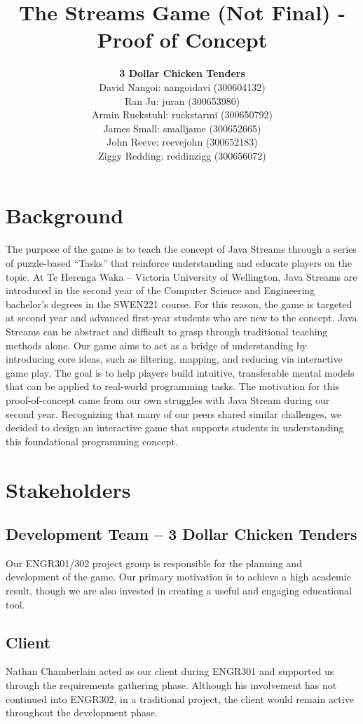 \documentclass{article}
\title{The Streams Game (Not Final) - Proof of Concept}
\author{ 
    \textbf{3 Dollar Chicken Tenders}
    \\
    David Nangoi: nangoidavi (300604132) \\ 
    Ran Ju: juran (300653980) \\ 
    Armin Ruckstuhl: ruckstarmi (300650792) \\ 
    James Small: smalljame (300652665) \\ 
    John Reeve: reevejohn (300652183) \\ 
    Ziggy Redding: reddinzigg (300656072) 
}
\date{}
\begin{document}
\maketitle

\section{Background}
The purpose of the game is to teach the concept of Java Streams through a series of puzzle-based “Tasks” that reinforce understanding and educate players on the topic. At Te Herenga Waka – Victoria University of Wellington, Java Streams are introduced in the second year of the Computer Science and Engineering bachelor’s degrees in the SWEN221 course. For this reason, the game is targeted at second year and advanced first-year students who are new to the concept. 
\newline\newline
Java Streams can be abstract and difficult to grasp through traditional teaching methods alone. Our game aims to act as a bridge of understanding by introducing core ideas, such as filtering, mapping, and reducing via interactive game play. The goal is to help players build intuitive, transferable mental models that can be applied to real-world programming tasks. 
\newline\newline
The motivation for this proof-of-concept came from our own struggles with Java Stream during our second year. Recognizing that many of our peers shared similar challenges, we decided to design an interactive game that supports students in understanding this foundational programming concept. 

\section{Stakeholders}

\subsection*{Development Team – 3 Dollar Chicken Tenders}
Our ENGR301/302 project group is responsible for the planning and development of the game. Our primary motivation is to achieve a high academic result, though we are also invested in creating a useful and engaging educational tool.

\subsection*{Client}
Nathan Chamberlain acted as our client during ENGR301 and supported us through the requirements gathering phase. Although his involvement has not continued into ENGR302, in a traditional project, the client would remain active throughout the development phase.
\end{document}
